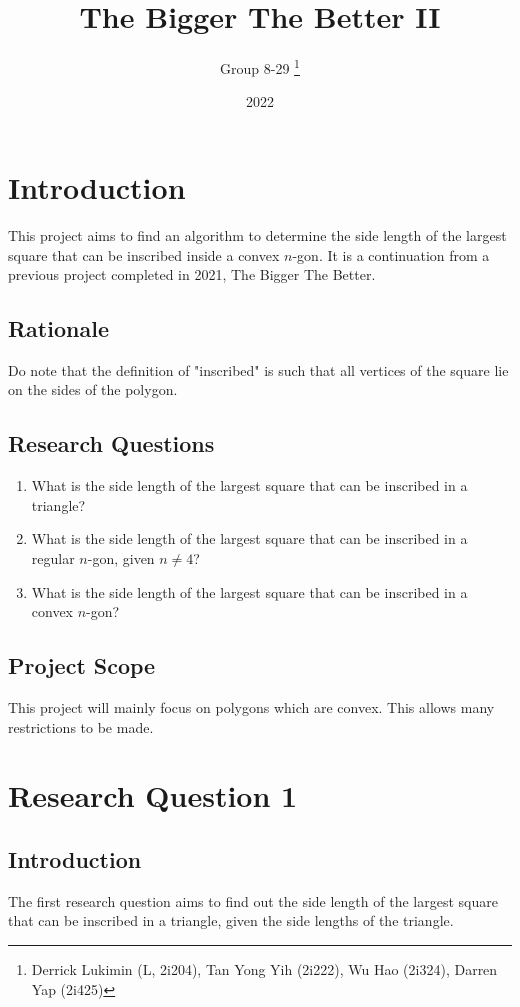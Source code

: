 \documentclass[12pt]{scrartcl}
\title{The Bigger The Better II}
\author{Group 8-29 \thanks{Derrick Lukimin (L, 2i204), Tan Yong Yih (2i222), Wu Hao (2i324), Darren Yap (2i425)}}
\date{2022}
\begin{document}
\onehalfspacing
\maketitle
\tableofcontents

\section{Introduction}
This project aims to find an algorithm to determine
the side length of the largest square that can be
inscribed inside a convex $n$-gon. It is a continuation from
a previous project completed in 2021, The Bigger The Better. \cite{tbtb1}

\subsection{Rationale}
Do note that the definition of "inscribed" is such that all vertices of the square lie on the sides of the polygon.

\subsection{Research Questions}
\begin{enumerate}
	\item What is the side length of the largest square that can be inscribed in a triangle?
	\item What is the side length of the largest square that can be inscribed in a regular $n$-gon, given $n \neq 4$?
	\item What is the side length of the largest square that can be inscribed in a convex $n$-gon?
\end{enumerate}

\subsection{Project Scope}
This project will mainly focus on polygons which are convex. This allows many restrictions to be made.

\section{Research Question 1}

\subsection{Introduction}
The first research question aims to find out the side length of the largest square that can be inscribed in a triangle, given the side lengths of the triangle.
\end{document}
